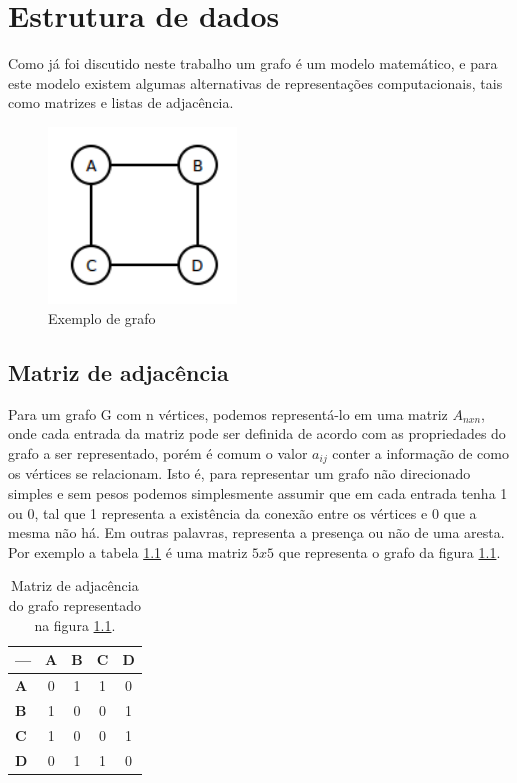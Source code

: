 \documentclass[a4paper]{abnt}
\begin{document}
\chapter{Estrutura de dados}
Como já foi discutido neste trabalho um grafo é um modelo matemático, e para este modelo existem algumas alternativas de representações computacionais, tais como matrizes e listas de adjacência.

\begin{figure}[htb]
    \centering
	\includegraphics[width=5cm]{graph_sample.png}
	\caption{Exemplo de grafo}
	\label{img_graph_sample}
\end{figure}

\section{Matriz de adjacência}
Para um grafo G com n vértices, podemos representá-lo em uma matriz $A_{n x n}$, onde cada entrada da matriz pode ser definida de acordo com as propriedades do grafo a ser representado, porém é comum o valor $a_{ij}$ conter a informação de como os vértices se relacionam. Isto é, para representar um grafo não direcionado simples e sem pesos podemos simplesmente assumir que em cada entrada tenha 1 ou 0, tal que 1 representa a existência da conexão entre os vértices e 0 que a mesma não há. Em outras palavras, representa a presença ou não de uma aresta.
Por exemplo a tabela \ref{tab_adj_matrix} é uma matriz $5 x 5$ que representa o grafo da figura \ref{img_graph_sample}.

\begin{table}[H]
        \centering
        \begin{tabular}{|l||c|c|c|c|} \hline
		---         & \textbf{A} & \textbf{B} & \textbf{C} & \textbf{D} \\ \hline \hline
		\textbf{A}  & 0          & 1          & 1          & 0 \\ \hline
		\textbf{B}	& 1          & 0          & 0          & 1 \\ \hline
		\textbf{C}	& 1          & 0          & 0          & 1 \\ \hline
		\textbf{D}	& 0          & 1          & 1          & 0 \\ \hline
        \end{tabular}
        \caption{Matriz de adjacência do grafo representado na figura \ref{img_graph_sample}.}
\label{tab_adj_matrix}
\end{table}
\end{document}
